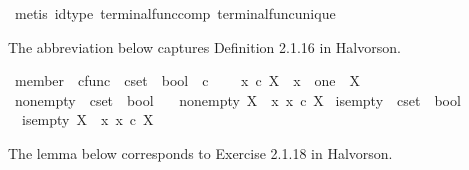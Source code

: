 \begin{isabellebody}
\ {\isacharparenleft}{\kern0pt}metis\ id{\isacharunderscore}{\kern0pt}type\ terminal{\isacharunderscore}{\kern0pt}func{\isacharunderscore}{\kern0pt}comp\ terminal{\isacharunderscore}{\kern0pt}func{\isacharunderscore}{\kern0pt}unique{\isacharparenright}{\kern0pt}%
\endisatagproof
{\isafoldproof}%
%
\isadelimproof
%
\endisadelimproof
%
\isadelimdocument
%
\endisadelimdocument
%
\isatagdocument
%
\isamarkuptrue%
%
\endisatagdocument
{\isafolddocument}%
%
\isadelimdocument
%
\endisadelimdocument
%
\begin{isamarkuptext}%
The abbreviation below captures Definition 2.1.16 in Halvorson.%
\end{isamarkuptext}\isamarkuptrue%
\isamarkupfalse%
\ member\ {\isacharcolon}{\kern0pt}{\isacharcolon}{\kern0pt}\ {\isachardoublequoteopen}cfunc\ {\isasymRightarrow}\ cset\ {\isasymRightarrow}\ bool{\isachardoublequoteclose}\ {\isacharparenleft}{\kern0pt}\ {\isachardoublequoteopen}{\isasymin}\isactrlsub c{\isachardoublequoteclose}\ {}{}{\isacharparenright}{\kern0pt}\ \isanewline
\ \ {\isachardoublequoteopen}x\ {\isasymin}\isactrlsub c\ X\ {\isasymequiv}\ {\isacharparenleft}{\kern0pt}x\ {\isacharcolon}{\kern0pt}\ one\ {\isasymrightarrow}\ X{\isacharparenright}{\kern0pt}{\isachardoublequoteclose}\isanewline
\isanewline
{}\isamarkupfalse%
\ nonempty\ {\isacharcolon}{\kern0pt}{\isacharcolon}{\kern0pt}\ {\isachardoublequoteopen}cset\ {\isasymRightarrow}\ bool{\isachardoublequoteclose}\ \isanewline
\ \ {\isachardoublequoteopen}nonempty\ X\ {\isasymequiv}\ {\isacharparenleft}{\kern0pt}{\isasymexists}x{\isachardot}{\kern0pt}\ x\ {\isasymin}\isactrlsub c\ X{\isacharparenright}{\kern0pt}{\isachardoublequoteclose}\isanewline
\isanewline
{}\isamarkupfalse%
\ is{\isacharunderscore}{\kern0pt}empty\ {\isacharcolon}{\kern0pt}{\isacharcolon}{\kern0pt}\ {\isachardoublequoteopen}cset\ {\isasymRightarrow}\ bool{\isachardoublequoteclose}\ \isanewline
\ \ {\isachardoublequoteopen}is{\isacharunderscore}{\kern0pt}empty\ X\ {\isasymequiv}\ {\isasymnot}{\isacharparenleft}{\kern0pt}{\isasymexists}x{\isachardot}{\kern0pt}\ x\ {\isasymin}\isactrlsub c\ X{\isacharparenright}{\kern0pt}{\isachardoublequoteclose}%
\begin{isamarkuptext}%
The lemma below corresponds to Exercise 2.1.18 in Halvorson.%
\end{isamarkuptext}\isamarkuptrue%
\isamarkupfalse%

\end{isabellebody}

